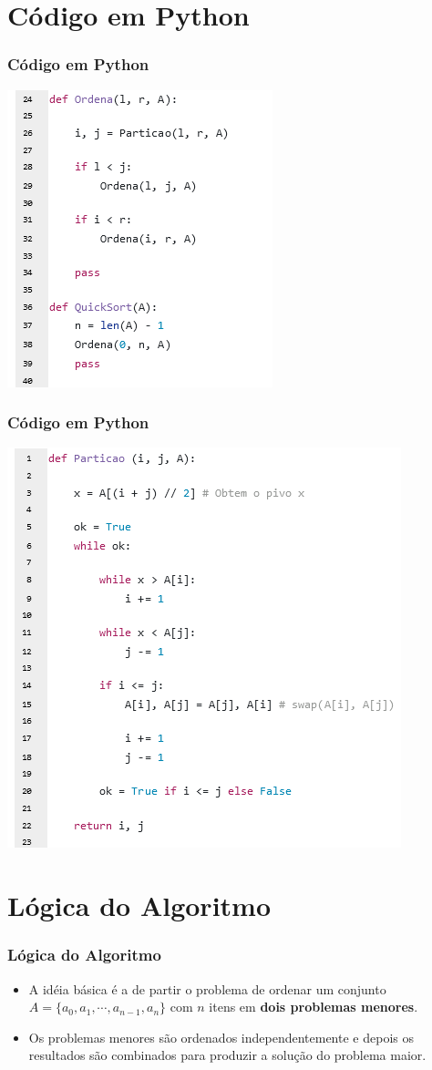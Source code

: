 \documentclass[
	11pt, %
]{beamer}
\begin{document}
\section{Código em Python}
\begin{frame}
	\frametitle{Código em Python}
	\includegraphics[width=0.6\linewidth]{quick_sort_in_python_ordena}
\end{frame}

\begin{frame}
	\frametitle{Código em Python}
	\includegraphics[width=0.7\linewidth]{quick_sort_in_python_particao}
\end{frame}

\section{Lógica do Algoritmo}
\begin{frame}
	\frametitle{Lógica do Algoritmo}
	\justifying
	\begin{itemize}
		\item A idéia básica é a de partir o problema de ordenar um conjunto $A = \{a_0, a_1, \cdots, a_{n-1}, a_{n} \}$ com $n$ itens em \textbf{dois problemas menores}.
		\item Os problemas menores são ordenados independentemente e depois os resultados são combinados para produzir a solução do problema maior.
	\end{itemize}
\end{frame}
\end{document}
